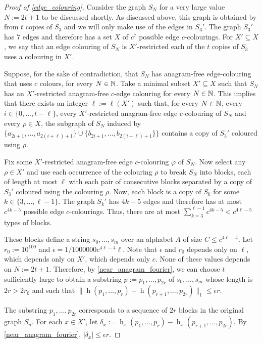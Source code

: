 \documentclass{patmorin}
\DeclareMathOperator{\hist}{h}
\begin{document}
\begin{proof}[Proof of \cref{edge_colouring}]
  Consider the graph $S_N$ for a very large value $N:=2t+1$ to be discussed shortly.  As discussed above, this graph is obtained by from $t$ copies of $S_3$ and we will only make use of the edges in $S_3'$.  The graph $S_3'$ has $7$ edges and therefore has a set $X$ of $c^7$ possible edge $c$-colourings.
  For $X'\subseteq X$, we say that an edge colouring of $S_N$ is $X'$-restricted each of the $t$ copies of $S_3$ uses a colouring in $X'$.

  Suppose, for the sake of contradiction, that $S_N$ has anagram-free edge-colouring that uses $c$ colours, for every $N\in\mathbb{N}$.  Take a minimal subset $X'\subseteq X$ such that $S_N$ has an $X'$-restricted anagram-free $c$-edge colouring for every $N\in\mathbb{N}$.  This implies that there exists an integer $\ell:=\ell(X')$ such that, for every $N\in\mathbb{N}$, every $i\in\{0,\ldots,t-\ell\}$, every $X'$-restricted anagram-free edge $c$-colouring of $S_N$ and every $\rho\in X$, the subgraph of $S_N$ induced by $\{a_{2i+1},\ldots,a_{2(i+\ell)+1}\}\cup \{b_{2i+1},\ldots,b_{2(i+\ell)+1}\}\}$ contains a copy of $S_3'$ coloured using $\rho$.


  Fix some $X'$-restricted anagram-free edge $c$-colouring $\varphi$ of $S_N$.
  Now select any $\rho\in X'$ and use each occurrence of the colouring $\rho$ to break $S_N$ into blocks, each of length at most $\ell$ with each pair of consecutive blocks separated by a copy of $S_3'$ coloured using the colouring $\rho$.  Now, each block is a copy of $S_k$ for some $k\in\{3,\ldots,\ell-1\}$.  The graph $S_k'$ has $4k-5$ edges and therefore has at most $c^{4k-5}$ possible edge $c$-colourings.  Thus, there are at most $\sum_{k=3}^{\ell-1} c^{4k-5} < c^{4\ell-5}$ types of blocks.

  These blocks define a string $s_0,\ldots,s_m$ over an alphabet $A$ of size $C\le c^{4\ell-4}$.  Let $r_0:=10^{100}$ and $\epsilon=1/1000000c^{4\ell-4}\ell$. Note that $\epsilon$ and $r_0$ depends only on $\ell$, which depends only on $X'$, which depends only $c$.  None of these values depends on $N:=2t+1$.  Therefore, by \cref{near_anagram_fourier}, we can choose $t$ sufficiently large to obtain a substring $p:=p_1,\ldots,p_{2r}$ of $s_0,\ldots,s_m$ whose length is $2r>2r_0$ and such that $\|\hist(p_1,\ldots,p_{r})-\hist(p_{r+1},\ldots,p_{2r})\|_1\le \epsilon r$.

  The substring $p_1,\ldots,p_{2r}$ corresponds to a sequence of $2r$ blocks in the original graph $S_n$. For each $x\in X'$, let $\delta_x:=\hist_x(p_1,\ldots,p_r)-\hist_x(p_{r+1},\ldots,p_{2r})$.  By \cref{near_anagram_fourier}, $|\delta_x|\le \epsilon r$.


\end{proof}
\end{document}
